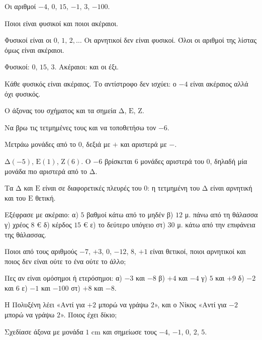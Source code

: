 \tixero Οι αριθμοί $-4$, $0$, $15$, $-1$, $3$, $-100$.\par
\tithelo Ποιοι είναι φυσικοί και ποιοι ακέραιοι.\par
\possindeo Φυσικοί είναι οι $0,\,1,\,2,\dots$ Οι αρνητικοί δεν είναι φυσικοί. Όλοι οι αριθμοί της λίστας όμως είναι ακέραιοι.\par
\apantisi Φυσικοί: $0$, $15$, $3$. Ακέραιοι: και οι έξι.\par
\elegxos Κάθε φυσικός είναι ακέραιος. Το αντίστροφο δεν ισχύει: ο $-4$ είναι ακέραιος αλλά όχι φυσικός.

\tixero Ο άξονας του σχήματος και τα σημεία $\mathrm{Δ}$, $\mathrm{Ε}$, $\mathrm{Ζ}$.\par
\tithelo Να βρω τις τετμημένες τους και να τοποθετήσω τον $-6$.\par
\possindeo Μετράω μονάδες από το $0$, δεξιά με $+$ και αριστερά με $-$.\par
\begin{center}
\end{center}
\apantisi $\mathrm{Δ}(-5)$, $\mathrm{Ε}(1)$, $\mathrm{Ζ}(6)$. Ο $-6$ βρίσκεται $6$ μονάδες αριστερά του $0$, δηλαδή μία μονάδα πιο αριστερά από το $\mathrm{Δ}$.\par
\elegxos Τα $\mathrm{Δ}$ και $\mathrm{Ε}$ είναι σε διαφορετικές πλευρές του $0$: η τετμημένη του $\mathrm{Δ}$ είναι αρνητική και του $\mathrm{Ε}$ θετική.



\ex Εξέφρασε με ακέραιο: α) $5$ βαθμοί κάτω από το μηδέν \quad β) $12$ μ. πάνω από τη θάλασσα \quad γ) χρέος $8$ € \quad δ) κέρδος $15$ € \quad ε) το δεύτερο υπόγειο \quad στ) $30$ μ. κάτω από την επιφάνεια της θάλασσας.

\ex Ποιοι από τους αριθμούς $-7$, $+3$, $0$, $-12$, $8$, $+1$ είναι θετικοί, ποιοι αρνητικοί και ποιος δεν είναι ούτε το ένα ούτε το άλλο;

\ex Πες αν είναι ομόσημοι ή ετερόσημοι: α) $-3$ και $-8$ \quad β) $+4$ και $-4$ \quad γ) $5$ και $+9$ \quad δ) $-2$ και $6$ \quad ε) $-1$ και $-100$ \quad στ) $+8$ και $-8$.

\ex Η Πολυξένη λέει «Αντί για $+2$ μπορώ να γράψω $2$», και ο Νίκος «Αντί για $-2$ μπορώ να γράψω $2$». Ποιος έχει δίκιο;

\ex Σχεδίασε άξονα με μονάδα $1$ cm και σημείωσε τους $-4$, $-1$, $0$, $2$, $5$.

